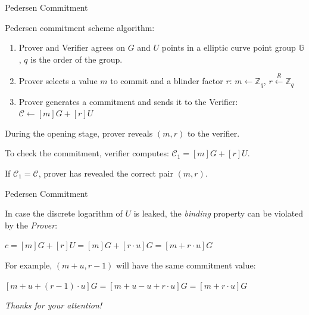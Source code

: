\documentclass[xcolor={usenames,dvipsnames}]{beamer}
\begin{document}
    \begin{frame}{Pedersen Commitment}

        \begin{definition}
            Pedersen commitment scheme algorithm:
            \begin{enumerate}
                \item Prover and Verifier agrees on $G$ and $U$ points in a elliptic curve point group $\mathbb{G}$, $q$ is the order of the group.
                \item Prover selects a value $m$ to commit and a blinder factor $r$:
                        $m \leftarrow \mathbb{Z}_q$,
                        $r \xleftarrow{R} \mathbb{Z}_q$
                \item Prover generates a commitment and sends it to the Verifier:
                        $\mathcal{C} \gets [m]G + [r]U$
            \end{enumerate}
        \end{definition}

        During the opening stage, prover reveals $(m, r)$ to the verifier. 
        
        To check the commitment, verifier computes: $\mathcal{C}_1 = [m]G + [r]U$. 
        
        If $\mathcal{C}_1 = \mathcal{C}$, prover has revealed the correct pair $(m, r)$.

    \end{frame}

    \begin{frame}{Pedersen Commitment}

            In case the discrete logarithm of $U$ is leaked, the \textit{binding} property can be violated by the \textit{Prover}:
        
            \begin{center}
                $c = [m]G + [r]U = [m] G + [r \cdot u]G = [m + r \cdot u] G$
            \end{center}
        
            For example, $(m + u, r - 1)$ will have the same commitment value:
        
            \begin{center}
                $[m+u + (r-1) \cdot u] G = [m + u - u + r \cdot u] G = [m + r \cdot u] G$     
            \end{center}
            
    \end{frame}
    
	\begin{frame}{}
      \centering \Large
      \emph{Thanks for your attention!}
    \end{frame}
\end{document}
